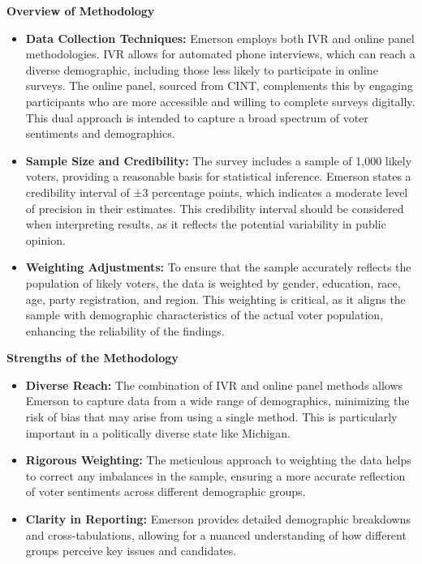 \documentclass[
  letterpaper,
  DIV=11,
  numbers=noendperiod]{scrartcl}
\begin{document}
\textbf{Overview of Methodology}

\begin{itemize}
\item
  \textbf{Data Collection Techniques:} Emerson employs both IVR and
  online panel methodologies. IVR allows for automated phone interviews,
  which can reach a diverse demographic, including those less likely to
  participate in online surveys. The online panel, sourced from CINT,
  complements this by engaging participants who are more accessible and
  willing to complete surveys digitally. This dual approach is intended
  to capture a broad spectrum of voter sentiments and demographics.
\item
  \textbf{Sample Size and Credibility:} The survey includes a sample of
  1,000 likely voters, providing a reasonable basis for statistical
  inference. Emerson states a credibility interval of ±3 percentage
  points, which indicates a moderate level of precision in their
  estimates. This credibility interval should be considered when
  interpreting results, as it reflects the potential variability in
  public opinion.
\item
  \textbf{Weighting Adjustments:} To ensure that the sample accurately
  reflects the population of likely voters, the data is weighted by
  gender, education, race, age, party registration, and region. This
  weighting is critical, as it aligns the sample with demographic
  characteristics of the actual voter population, enhancing the
  reliability of the findings.
\end{itemize}

\textbf{Strengths of the Methodology}

\begin{itemize}
\item
  \textbf{Diverse Reach:} The combination of IVR and online panel
  methods allows Emerson to capture data from a wide range of
  demographics, minimizing the risk of bias that may arise from using a
  single method. This is particularly important in a politically diverse
  state like Michigan.
\item
  \textbf{Rigorous Weighting:} The meticulous approach to weighting the
  data helps to correct any imbalances in the sample, ensuring a more
  accurate reflection of voter sentiments across different demographic
  groups.
\item
  \textbf{Clarity in Reporting:} Emerson provides detailed demographic
  breakdowns and cross-tabulations, allowing for a nuanced understanding
  of how different groups perceive key issues and candidates.
\end{itemize}
\end{document}

